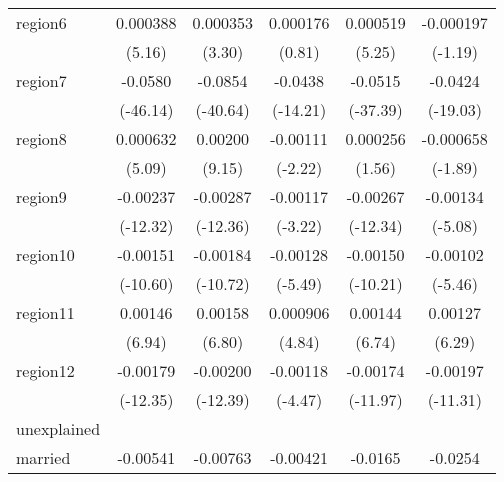 \begin{table}[htbp]
\begin{tabular}{l*{5}{c}}
region6     &    0.000388\sym{***}&    0.000353\sym{***}&    0.000176         &    0.000519\sym{***}&   -0.000197         \\
            &      (5.16)         &      (3.30)         &      (0.81)         &      (5.25)         &     (-1.19)         \\
region7     &     -0.0580\sym{***}&     -0.0854\sym{***}&     -0.0438\sym{***}&     -0.0515\sym{***}&     -0.0424\sym{***}\\
            &    (-46.14)         &    (-40.64)         &    (-14.21)         &    (-37.39)         &    (-19.03)         \\
region8     &    0.000632\sym{***}&     0.00200\sym{***}&    -0.00111\sym{*}  &    0.000256         &   -0.000658         \\
            &      (5.09)         &      (9.15)         &     (-2.22)         &      (1.56)         &     (-1.89)         \\
region9     &    -0.00237\sym{***}&    -0.00287\sym{***}&    -0.00117\sym{**} &    -0.00267\sym{***}&    -0.00134\sym{***}\\
            &    (-12.32)         &    (-12.36)         &     (-3.22)         &    (-12.34)         &     (-5.08)         \\
region10    &    -0.00151\sym{***}&    -0.00184\sym{***}&    -0.00128\sym{***}&    -0.00150\sym{***}&    -0.00102\sym{***}\\
            &    (-10.60)         &    (-10.72)         &     (-5.49)         &    (-10.21)         &     (-5.46)         \\
region11    &     0.00146\sym{***}&     0.00158\sym{***}&    0.000906\sym{***}&     0.00144\sym{***}&     0.00127\sym{***}\\
            &      (6.94)         &      (6.80)         &      (4.84)         &      (6.74)         &      (6.29)         \\
region12    &    -0.00179\sym{***}&    -0.00200\sym{***}&    -0.00118\sym{***}&    -0.00174\sym{***}&    -0.00197\sym{***}\\
            &    (-12.35)         &    (-12.39)         &     (-4.47)         &    (-11.97)         &    (-11.31)         \\
\hline
unexplained &                     &                     &                     &                     &                     \\
married     &    -0.00541         &    -0.00763         &    -0.00421         &     -0.0165\sym{*}  &     -0.0254\sym{*}  \\

\end{tabular}
\end{table}
